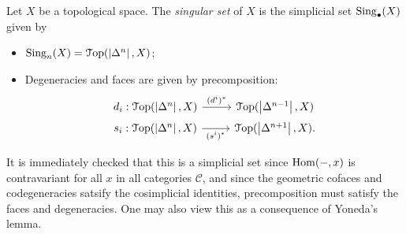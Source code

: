 \begin{definition}\label{4.1.1}
	Let $X$ be a topological space. The \emph{singular set} of $X$ is the simplicial set $\operatorname{Sing}_{\bullet} (X)$ given by
	\begin{itemize}
		\item $\operatorname{Sing}_n(X)=\mathcal{T}\mathrm{op} (\left| \Delta^n \right| ,X)$;
		\item Degeneracies and faces are given by precomposition:
			\[\begin{tikzcd}[row sep = 0em, column sep = 2.5em]
			d_i : \Top (\left| \Delta^n \right| ,X)\ar[" (d^i)^* ", r]  & \Top (\left| \Delta^{n-1}  \right| ,X) \\
			s_i : \Top (\left| \Delta^n \right| ,X)\ar[" (s^i)^* "', r]  & \Top (\left| \Delta^{n+1}  \right| ,X).
			\end{tikzcd}\]
	\end{itemize}
\end{definition}

\begin{remark}\label{4.1.2}
	It is immediately checked that this is a simplicial set since $\operatorname{Hom}(-, x) $ is contravariant for all $x$ in all categories $\mathcal{C} $, and since the geometric cofaces and codegeneracies satsify the cosimplicial identities, precomposition must satisfy the faces and degeneracies. One may also view this as a consequence of Yoneda's lemma.
\end{remark}

